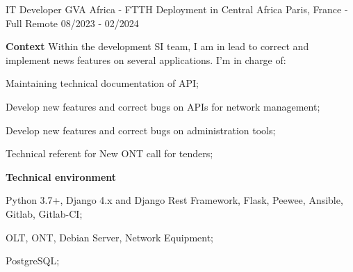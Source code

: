 \begin{cventries}
  \cventry
    {IT Developer} %
    {GVA Africa - FTTH Deployment in Central Africa} %
    {Paris, France - Full Remote} %
    {08/2023 - 02/2024} %
    {
      \textbf{Context}
      \newline
      Within the development SI team, I am in lead to correct and implement news features on several applications. I'm in charge of:
      \newline \vspace{12pt}
      \begin{cvitems} %
        \item {Maintaining technical documentation of API;}
        \item {Develop new features and correct bugs on APIs for network management;}
        \item {Develop new features and correct bugs on administration tools;}
        \item {Technical referent for New ONT call for tenders;}
      \end{cvitems}
      \textbf{Technical environment}
      \newline \vspace{12pt}
      \begin{cvitems}
        \item {Python 3.7+, Django 4.x and Django Rest Framework, Flask, Peewee, Ansible, Gitlab, Gitlab-CI;}
        \item {OLT, ONT, Debian Server, Network Equipment;}
        \item {PostgreSQL;}
      \end{cvitems}
    }
\end{cventries}